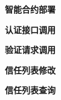\noindent\textbf{智能合约部署}



\noindent\textbf{认证接口调用}

\noindent\textbf{验证请求调用}

\noindent\textbf{信任列表修改}

\noindent\textbf{信任列表查询}








